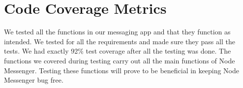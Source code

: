 \documentclass[12pt, titlepage]{article}
\begin{document}
\newpage
\section{Code Coverage Metrics}
We tested all the functions in our messaging app and that they function as intended. We tested for all the requirements and made sure they pass all the tests. We had exactly 92\% test coverage after all the testing was done. The functions we covered during testing carry out all the main functions of Node Messenger. Testing these functions will prove to be beneficial in keeping Node Messenger bug free.




\end{document}
